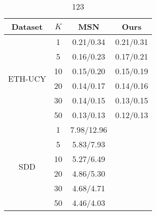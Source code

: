 \documentclass[../paper.tex]{subfiles}
\begin{document}
    
\begin{table*}[tbp]
    \renewcommand{\arraystretch}{1.3}
    \caption{
        123
    }
    \label{tab_k}
    \centering
    \begin{tabular}{c|c|c|c}
        \hline
        Dataset & $K$ & MSN & Ours \\
        
        \hline
        \multirow{6}{*}{ETH-UCY}
        & 1 & 0.21/0.34 & 0.21/0.31 \\
        & 5 & 0.16/0.23 & 0.17/0.21 \\
        & 10 & 0.15/0.20 & 0.15/0.19 \\
        & 20 & 0.14/0.17 & 0.14/0.16 \\
        & 30 & 0.14/0.15 & 0.13/0.15 \\
        & 50 & 0.13/0.13 & 0.12/0.13 \\

        \hline
        \multirow{6}{*}{SDD}
        & 1 & 7.98/12.96 \\
        & 5 & 5.83/7.93 & \\
        & 10 & 5.27/6.49 & \\
        & 20 & 4.86/5.30 & \\
        & 30 & 4.68/4.71 & \\
        & 50 & 4.46/4.03 & \\
        
        
        \hline
    \end{tabular}
\end{table*}
\end{document}

